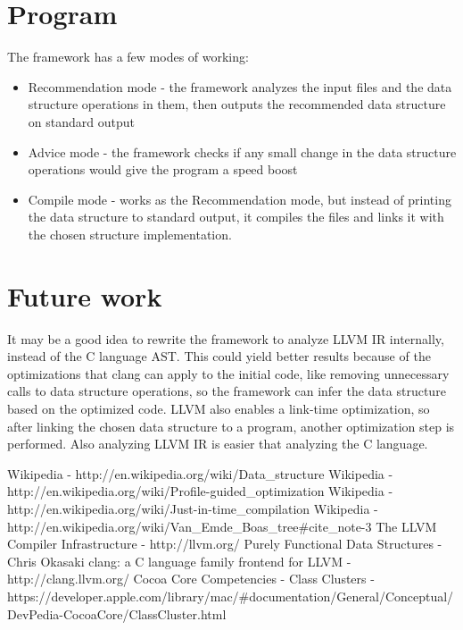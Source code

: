 \documentclass[a4paper,11pt]{article}
\begin{document}
\section{Program}

	The framework has a few modes of working:
	\begin{itemize}
		\item Recommendation mode - the framework analyzes the input files and the data structure operations in
			them, then outputs the recommended data structure on standard output
		\item Advice mode - the framework checks if any small change in the data structure operations would give
			the program a speed boost
		\item Compile mode - works as the Recommendation mode, but instead of printing the data structure to
			standard output, it compiles the files and links it with the chosen structure implementation.
	\end{itemize}

\section{Future work} \label{sec:future}
	It may be a good idea to rewrite the framework to analyze LLVM\cite{LLVM} IR internally, instead of the C
	language AST. This could yield better results because of the optimizations that clang\cite{Clang} can apply to
	the initial code, like removing unnecessary calls to data structure operations, so the framework can infer the
	data structure based on the optimized code. LLVM also enables a link-time optimization, so after linking the
	chosen data structure to a program, another optimization step is performed. Also analyzing LLVM IR is easier
	that analyzing the C language.

\begin{thebibliography}{9}
	 Wikipedia - http://en.wikipedia.org/wiki/Data\_structure
     Wikipedia - http://en.wikipedia.org/wiki/Profile-guided\_optimization
     Wikipedia - http://en.wikipedia.org/wiki/Just-in-time\_compilation
     Wikipedia - http://en.wikipedia.org/wiki/Van\_Emde\_Boas\_tree\#cite\_note-3
	 The LLVM Compiler Infrastructure - http://llvm.org/
	 Purely Functional Data Structures - Chris Okasaki
	 clang: a C language family frontend for LLVM - http://clang.llvm.org/
	 Cocoa Core Competencies - Class Clusters - \\
		https://developer.apple.com/library/mac/\#documentation/General/Conceptual/DevPedia-CocoaCore/ClassCluster.html
\end{thebibliography}
\end{document}
